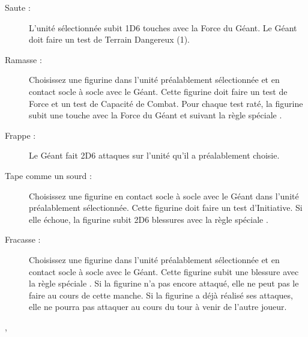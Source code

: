{{\begin{description}
			\item[Saute :]  L'unité sélectionnée subit 1D6 touches avec la Force du Géant. Le Géant doit faire un test de Terrain Dangereux (1).
			\item[Ramasse :] Choisissez une figurine dans l'unité préalablement sélectionnée et en contact socle à socle avec le Géant. Cette figurine doit faire un test de Force et un test de Capacité de Combat. Pour chaque test raté, la figurine subit une touche avec la Force du Géant et suivant la règle spéciale .
			\item[Frappe :] Le Géant fait 2D6 attaques sur l'unité qu'il a préalablement choisie.
			\item [Tape comme un sourd :] Choisissez une figurine en contact socle à socle avec le Géant dans l'unité préalablement sélectionnée. Cette figurine doit faire un test d'Initiative. Si elle échoue, la figurine subit 2D6 blessures avec la règle spéciale .
			\item[Fracasse :] Choisissez une figurine dans l'unité préalablement sélectionnée et en contact socle à socle avec le Géant. Cette figurine subit une blessure avec la règle spéciale . Si la figurine n'a pas encore attaqué, elle ne peut pas le faire au cours de cette manche. Si la figurine a déjà réalisé ses attaques, elle ne pourra pas attaquer au cours du tour à venir de l'autre joueur.
		\end{description}
	},
}
